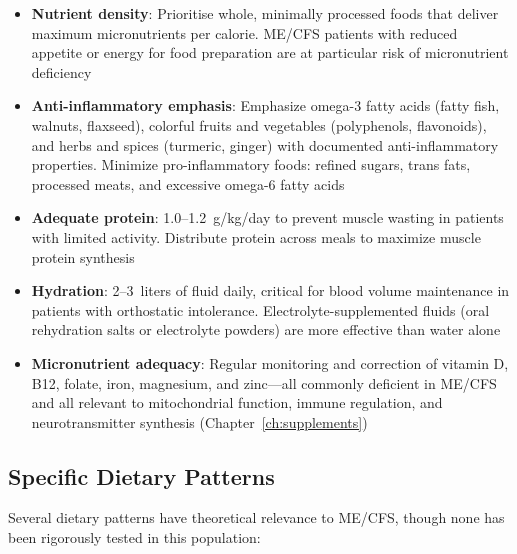 \begin{itemize}
    \item \textbf{Nutrient density}: Prioritise whole, minimally processed foods that deliver maximum micronutrients per calorie. ME/CFS patients with reduced appetite or energy for food preparation are at particular risk of micronutrient deficiency
    \item \textbf{Anti-inflammatory emphasis}: Emphasize omega-3 fatty acids (fatty fish, walnuts, flaxseed), colorful fruits and vegetables (polyphenols, flavonoids), and herbs and spices (turmeric, ginger) with documented anti-inflammatory properties. Minimize pro-inflammatory foods: refined sugars, trans fats, processed meats, and excessive omega-6 fatty acids
    \item \textbf{Adequate protein}: 1.0--1.2~g/kg/day to prevent muscle wasting in patients with limited activity. Distribute protein across meals to maximize muscle protein synthesis
    \item \textbf{Hydration}: 2--3~liters of fluid daily, critical for blood volume maintenance in patients with orthostatic intolerance. Electrolyte-supplemented fluids (oral rehydration salts or electrolyte powders) are more effective than water alone
    \item \textbf{Micronutrient adequacy}: Regular monitoring and correction of vitamin D, B12, folate, iron, magnesium, and zinc---all commonly deficient in ME/CFS and all relevant to mitochondrial function, immune regulation, and neurotransmitter synthesis (Chapter~\ref{ch:supplements})
\end{itemize}

\subsection{Specific Dietary Patterns}

Several dietary patterns have theoretical relevance to ME/CFS, though none has been rigorously tested in this population:

